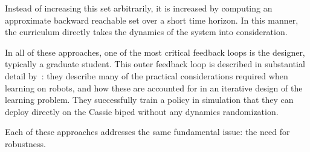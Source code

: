 Instead of increasing this set arbitrarily, it is increased by computing an approximate backward reachable set over a short time horizon.
In this manner, the curriculum directly takes the dynamics of the system into consideration. \par
In all of these approaches, one of the most critical feedback loops is the designer, typically a graduate student.
This outer feedback loop is described in substantial detail by~\textcite{xie2019cassie}: they describe many of the practical considerations required when learning on robots, and how these are accounted for in an iterative design of the learning problem.
They successfully train a policy in simulation that they can deploy directly on the Cassie biped without any dynamics randomization. \par
Each of these approaches addresses the same fundamental issue: the need for robustness. \par

